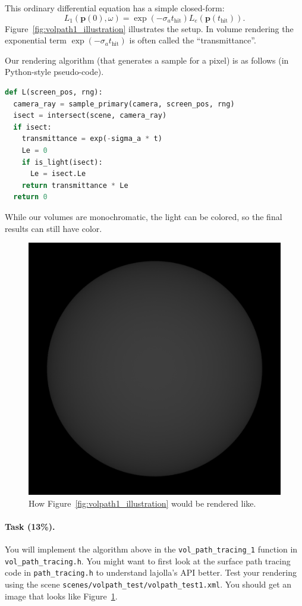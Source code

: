 This ordinary differential equation has a simple closed-form:
\begin{equation}
L_1(\mathbf{p}(0), \omega) = \exp\left(-\sigma_a t_{\text{hit}} \right) L_e(\mathbf{p}(t_{\text{hit}})).
\end{equation}
Figure~\ref{fig:volpath1_illustration} illustrates the setup. In volume rendering the exponential term
$\exp\left(-\sigma_a t_{\text{hit}} \right)$ is often called the ``transmittance''.

Our rendering algorithm (that generates a sample for a pixel) is as follows (in Python-style pseudo-code).
\begin{lstlisting}[language=python]
def L(screen_pos, rng):
  camera_ray = sample_primary(camera, screen_pos, rng)
  isect = intersect(scene, camera_ray)
  if isect:
    transmittance = exp(-sigma_a * t)
    Le = 0
    if is_light(isect):
      Le = isect.Le
    return transmittance * Le
  return 0
\end{lstlisting}

While our volumes are monochromatic, the light can be colored, so the final results can still have color.

\begin{figure}
\centering
\includegraphics[width=0.5\linewidth]{imgs/volpath_1.png}
\caption{How Figure~\ref{fig:volpath1_illustration} would be rendered like.}
\label{fig:volpath1}
\end{figure}

\paragraph{Task (13\%).} You will implement the algorithm above in the \lstinline{vol_path_tracing_1} function in \lstinline{vol_path_tracing.h}. You might want to first look at the surface path tracing code in \lstinline{path_tracing.h} to understand lajolla's API better. Test your rendering using the scene \lstinline{scenes/volpath_test/volpath_test1.xml}. You should get an image that looks like Figure~\ref{fig:volpath1}.

